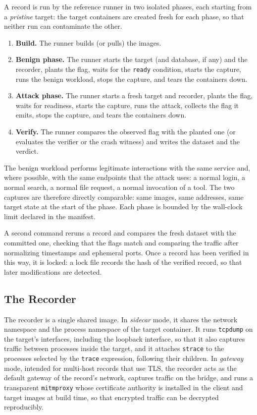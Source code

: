 A record is run by the reference runner in two isolated phases, each starting
from a \emph{pristine} target: the target containers are created fresh for
each phase, so that neither run can contaminate the other.

\begin{enumerate}
\item \textbf{Build.} The runner builds (or pulls) the images.
\item \textbf{Benign phase.} The runner starts the target (and database, if
any) and the recorder, plants the flag, waits for the \texttt{ready}
condition, starts the capture, runs the benign workload, stops the capture,
and tears the containers down.
\item \textbf{Attack phase.} The runner starts a fresh target and recorder,
plants the flag, waits for readiness, starts the capture, runs the attack,
collects the flag it emits, stops the capture, and tears the containers
down.
\item \textbf{Verify.} The runner compares the observed flag with the planted
one (or evaluates the verifier or the crash witness) and writes the dataset
and the verdict.
\end{enumerate}

The benign workload performs legitimate interactions with the same service
and, where possible, with the same endpoints that the attack uses: a normal
login, a normal search, a normal file request, a normal invocation of a tool.
The two captures are therefore directly comparable: same images, same
addresses, same target state at the start of the phase. Each phase is bounded
by the wall-clock limit declared in the manifest.

A second command reruns a record and compares the fresh dataset with the
committed one, checking that the flags match and comparing the traffic after
normalizing timestamps and ephemeral ports. Once a record has been verified in
this way, it is locked: a lock file records the hash of the verified record,
so that later modifications are detected.

\subsection{The Recorder}

The recorder is a single shared image. In \emph{sidecar} mode, it shares the
network namespace and the process namespace of the target container. It runs
\texttt{tcpdump} on the target's interfaces, including the loopback
interface, so that it also captures traffic between processes inside the
target, and it attaches \texttt{strace} to the processes selected by the
\texttt{trace} expression, following their children. In \emph{gateway} mode,
intended for multi-host records that use TLS, the recorder acts as the
default gateway of the record's network, captures traffic on the bridge, and
runs a transparent \texttt{mitmproxy} whose certificate authority is
installed in the client and target images at build time, so that encrypted
traffic can be decrypted reproducibly.

